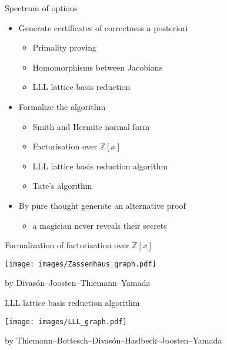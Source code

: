 \documentclass[11pt, aspectratio=169]{beamer}
\newcommand{\Z}{\mathbb{Z}}
\begin{document}
\begin{frame}{Spectrum of options}
    \begin{itemize}
            \item {} Generate certificates of correctness a posteriori
        \begin{itemize}
            \item Primality proving
            \item Homomorphisms between Jacobians
            \item LLL lattice basis reduction
        \end{itemize}
        \pause
        \item {} Formalize the algorithm
            \begin{itemize}
                \item Smith and Hermite normal form
                \item Factorisation over $\Z[x]$
                \item LLL lattice basis reduction algorithm
                \item Tate's algorithm
            \end{itemize}
        \pause
        \item {} By pure thought generate an alternative proof
            \pause
            \begin{itemize}
                \item a magician never reveals their secrets
            \end{itemize}
    \end{itemize}
\end{frame}

\begin{frame}{ Formalization of factorization over $\Z[x]$}
\vspace{-0.5em}
\begin{center}
\texttt{[image: images/Zassenhaus\_graph.pdf]}\\
\end{center}
\vspace{-0.5em}
by Divasón--Joosten--Thiemann--Yamada
\end{frame}

\begin{frame}{ LLL lattice basis reduction algorithm}
\vspace{-0.5em}
    \begin{center}
\texttt{[image: images/LLL\_graph.pdf]}\\
\end{center}
by Thiemann--Bottesch--Divasón--Haslbeck--Joosten--Yamada
\end{frame}
\end{document}
